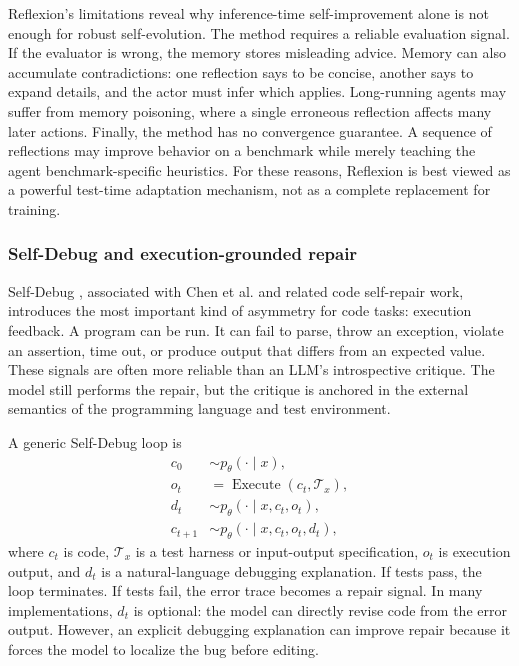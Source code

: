 Reflexion's limitations reveal why inference-time self-improvement alone is not enough for robust self-evolution. The method requires a reliable evaluation signal. If the evaluator is wrong, the memory stores misleading advice. Memory can also accumulate contradictions: one reflection says to be concise, another says to expand details, and the actor must infer which applies. Long-running agents may suffer from memory poisoning, where a single erroneous reflection affects many later actions. Finally, the method has no convergence guarantee. A sequence of reflections may improve behavior on a benchmark while merely teaching the agent benchmark-specific heuristics. For these reasons, Reflexion is best viewed as a powerful test-time adaptation mechanism, not as a complete replacement for training.

\subsubsection{Self-Debug and execution-grounded repair}
\label{subsubsec:self-debug}

Self-Debug \cite{singh2023selfdebug}, associated with Chen et al. and related code self-repair work, introduces the most important kind of asymmetry for code tasks: execution feedback. A program can be run. It can fail to parse, throw an exception, violate an assertion, time out, or produce output that differs from an expected value. These signals are often more reliable than an LLM's introspective critique. The model still performs the repair, but the critique is anchored in the external semantics of the programming language and test environment.

A generic Self-Debug loop is
\begin{align}
    c_0 &\sim p_\theta(\cdot \mid x),\\
    o_t &= \operatorname{Execute}(c_t, \mathcal{T}_x),\\
    d_t &\sim p_\theta(\cdot \mid x,c_t,o_t),\\
    c_{t+1} &\sim p_\theta(\cdot \mid x,c_t,o_t,d_t),
    \label{eq:self-debug-loop}
\end{align}
where $c_t$ is code, $\mathcal{T}_x$ is a test harness or input-output specification, $o_t$ is execution output, and $d_t$ is a natural-language debugging explanation. If tests pass, the loop terminates. If tests fail, the error trace becomes a repair signal. In many implementations, $d_t$ is optional: the model can directly revise code from the error output. However, an explicit debugging explanation can improve repair because it forces the model to localize the bug before editing.

